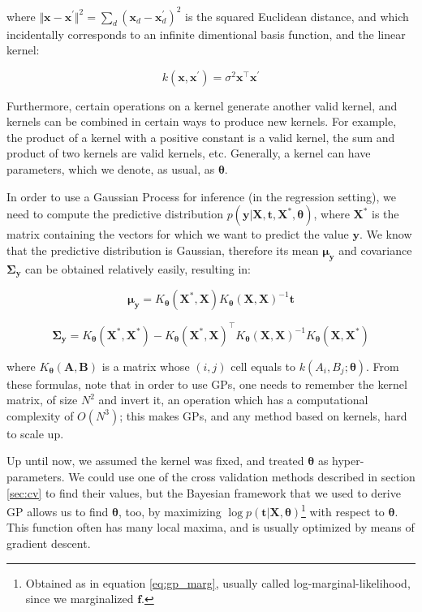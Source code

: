 \documentclass[a4paper,11pt]{kth-mag}
\begin{document}
\noindent where $\Vert\bm x-\bm x^\prime\Vert^2=\sum_d(\bm x_d-\bm x_d^\prime)^2$ is the squared Euclidean distance, and which incidentally corresponds to an infinite dimentional basis function, and the linear kernel:

\begin{equation}
k(\bm x, \bm x^\prime)=\sigma^2\bm x^\intercal\bm x^\prime
\end{equation}

Furthermore, certain operations on a kernel generate another valid kernel, and kernels can be combined in certain ways to produce new kernels. For example, the product of a kernel with a positive constant is a valid kernel, the sum and product of two kernels are valid kernels, etc. Generally, a kernel can have parameters, which we denote, as usual, as $\bm\theta$.

In order to use a Gaussian Process for inference (in the regression setting), we need to compute the predictive distribution $p(\bm y\vert\bm X, \bm t, \bm X^*,\bm\theta) $, where $\bm X^*$ is the matrix containing the vectors for which we want to predict the value $\bm y$. We know that the predictive distribution is Gaussian, therefore its mean $\bm\mu_{\bm y}$ and covariance $\bm\Sigma_{\bm y}$ can be obtained relatively easily, resulting in:

\begin{equation}
\label{eq:gp_pred_mean}
\bm\mu_{\bm y}=K_{\bm\theta}(\bm X^*,\bm X) K_{\bm\theta}(\bm X,\bm X)^{-1}\bm t
\end{equation}

\begin{equation}
\bm\Sigma_{\bm y}=K_{\bm\theta}(\bm X^*,\bm X^*)-K_{\bm\theta}(\bm X^*,\bm X)^\intercal K_{\bm\theta}(\bm X, \bm X)^{-1}K_{\bm\theta}(\bm X,\bm X^*)
\end{equation}

\noindent where $K_{\bm\theta}(\bm A,\bm B)$ is a matrix whose $(i,j)$ cell equals to $k(A_i,B_j;\bm\theta)$. From these formulas, note that in order to use GPs, one needs to remember the kernel matrix, of size $N^2$ and invert it, an operation which has a computational complexity of $O(N^3)$; this makes GPs, and any method based on kernels, hard to scale up.

Up until now, we assumed the kernel was fixed, and treated $\bm\theta$ as hyper-parameters. We could use one of the cross validation methods described in section \ref{sec:cv} to find their values, but the Bayesian framework that we used to derive GP allows us to find $\bm\theta$, too, by maximizing $\log p(\bm t\vert\bm X,\bm\theta)$\footnote{Obtained as in equation \ref{eq:gp_marg}, usually called log-marginal-likelihood, since we marginalized $\bm f$.} with respect to $\bm\theta$. This function often has many local maxima, and is usually optimized by means of gradient descent.
\end{document}
